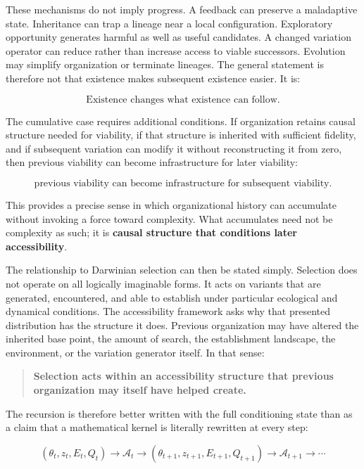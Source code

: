 \documentclass[11pt,a4paper]{article}
\begin{document}
These mechanisms do not imply progress. A feedback can preserve a
maladaptive state. Inheritance can trap a lineage near a local
configuration. Exploratory opportunity generates harmful as well as
useful candidates. A changed variation operator can reduce rather than
increase access to viable successors. Evolution may simplify
organization or terminate lineages. The general statement is therefore
not that existence makes subsequent existence easier. It is:

\[
\boxed{\text{Existence changes what existence can follow.}}
\]

The cumulative case requires additional conditions. If organization
retains causal structure needed for viability, if that structure is
inherited with sufficient fidelity, and if subsequent variation can
modify it without reconstructing it from zero, then previous viability
can become infrastructure for later viability:

\[
\boxed{\text{previous viability can become infrastructure for subsequent viability}.}
\]

This provides a precise sense in which organizational history can
accumulate without invoking a force toward complexity. What accumulates
need not be complexity as such; it is \textbf{causal structure that
conditions later accessibility}.

The relationship to Darwinian selection can then be stated simply.
Selection does not operate on all logically imaginable forms. It acts on
variants that are generated, encountered, and able to establish under
particular ecological and dynamical conditions. The accessibility
framework asks why that presented distribution has the structure it
does. Previous organization may have altered the inherited base point,
the amount of search, the establishment landscape, the environment, or
the variation generator itself. In that sense:

\begin{quote}
\textbf{Selection acts within an accessibility structure that previous
organization may itself have helped create.}
\end{quote}

The recursion is therefore better written with the full conditioning
state than as a claim that a mathematical kernel is literally rewritten
at every step:

\[
(\theta_t,z_t,E_t,Q_t)
\longrightarrow
\mathcal A_t
\longrightarrow
(\theta_{t+1},z_{t+1},E_{t+1},Q_{t+1})
\longrightarrow
\mathcal A_{t+1}
\longrightarrow\cdots
\]
\end{document}
